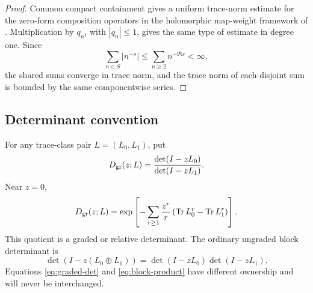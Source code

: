 \begin{proof}
Common compact containment gives a uniform trace-norm estimate for the
zero-form composition operators in the holomorphic map-weight framework of
\citet{BandtlowJenkinson2008}.  Multiplication by \(q_n\), with
\(|q_n|\le1\), gives the same type of estimate in degree one.  Since
\[
 \sum_{n\in S}|n^{-s}|\le\sum_{n\ge2}n^{-\Re s}<\infty,
\]
the shared sums converge in trace norm, and the trace norm of each disjoint
sum is bounded by the same componentwise series.
\end{proof}

\subsection{Determinant convention}

For any trace-class pair \(L=(L_0,L_1)\), put
\begin{equation}
 D_{\mathrm{gr}}(z;L)=\frac{\det(I-zL_0)}{\det(I-zL_1)}.
 \label{eq:graded-det}
\end{equation}
Near \(z=0\),
\begin{equation}
 D_{\mathrm{gr}}(z;L)
 =\exp\left[-\sum_{r\ge1}\frac{z^r}{r}
 \left(\operatorname{Tr} L_0^r-\operatorname{Tr} L_1^r\right)\right].
 \label{eq:graded-log}
\end{equation}
This quotient is a graded or relative determinant.  The ordinary ungraded
block determinant is
\begin{equation}
 \det(I-z(L_0\oplus L_1))
 =\det(I-zL_0)\det(I-zL_1).
 \label{eq:block-product}
\end{equation}
Equations \eqref{eq:graded-det} and \eqref{eq:block-product} have different
ownership and will never be interchanged.
